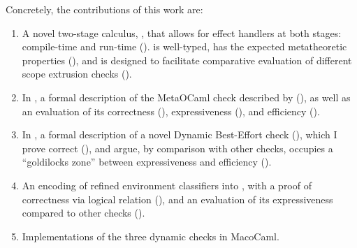 Concretely, the contributions of this work are:
\begin{enumerate}
    \item A novel two-stage calculus, \calculusName{}, that allows for effect handlers at both stages: compile-time and run-time (). \calculusName{} is well-typed, has the expected metatheoretic properties (), and is designed to facilitate comparative evaluation of different scope extrusion checks ().
    \item In \calculusName{}, a formal description of the MetaOCaml check described by \citet{kiselyov-14} (), as well as an evaluation of its correctness (), expressiveness (), and efficiency ().
    \item In \calculusName{}, a formal description of a novel Dynamic Best-Effort check (), which I prove correct (), and argue, by comparison with other checks, occupies a ``goldilocks zone'' between expressiveness and efficiency (). 
    \item An encoding of refined environment classifiers \citep{kiselyov-16} into \calculusName{}, with a proof of correctness via logical relation (), and an evaluation of its expressiveness compared to other checks ().
    \item Implementations of the three dynamic checks in MacoCaml.
\end{enumerate}

